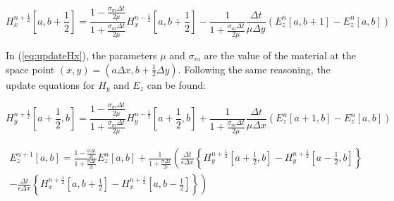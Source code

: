 \begin{equation}
	H_x^{n+\frac{1}{2}}\left[a,b+\frac{1}{2}\right] =
	\frac{1-\frac{\sigma_m \Delta t}{2 \mu}}{1+\frac{\sigma_m \Delta t}{2 \mu}} H_x^{n-\frac{1}{2}}\left[a,b+\frac{1}{2}\right] -
	\frac{1}{1 + \frac{\sigma_m \Delta t}{2 \mu}} \frac{\Delta t}{\mu \Delta y}
	(E_z^n[a,b+1] - E_z^n[a,b])
	\label{eq:updateHx}
\end{equation}

In (\ref{eq:updateHx}), the parameters $\mu$ and $\sigma_m$ are the value of the material at the space point $(x,y) = (a \Delta x, b + \frac{1}{2} \Delta y)$. Following the same reasoning, the update equations for $H_y$ and $E_z$ can be found:

\begin{equation}
H_y^{n+\frac{1}{2}}\left[a+\frac{1}{2},b\right] =
\frac{1-\frac{\sigma_m \Delta t}{2 \mu}}{1+\frac{\sigma_m \Delta t}{2 \mu}} H_y^{n-\frac{1}{2}}\left[a+\frac{1}{2},b\right] +
\frac{1}{1 + \frac{\sigma_m \Delta t}{2 \mu}} \frac{\Delta t}{\mu \Delta x}
(E_z^n[a+1,b] - E_z^n[a,b])
\end{equation}

\begin{equation}
\begin{aligned}
E_z^{n+1}[a,b] =
\frac{1-\frac{\sigma \Delta t}{2 \epsilon}}{1+\frac{\sigma \Delta t}{2 \epsilon}} E_z^{n}[a,b] + \frac{1}{1+\frac{\sigma \Delta t}{2 \epsilon}}
\left(
\frac{\Delta t}{\epsilon \Delta x} \left\{ H_y^{n+\frac{1}{2} } \left[a + \frac{1}{2}, b\right] -  H_y^{n+\frac{1}{2} } \left[a - \frac{1}{2}, b\right] 
\right\} \right.\\
\left.- \frac{\Delta t}{\epsilon \Delta x} \left\{
H_x^{n+\frac{1}{2} } \left[a,b+ \frac{1}{2}\right] -  H_x^{n+\frac{1}{2} } \left[a, b- \frac{1}{2}\right]
\right\} \right)
\label{eq:update2}
\end{aligned}
\end{equation}